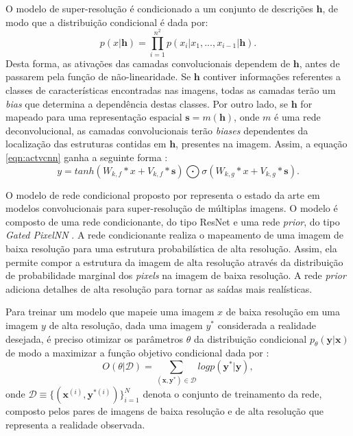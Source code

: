 O modelo de super-resolução é condicionado a um conjunto de
descrições $\boldsymbol{h}$, de modo que a distribuição condicional é dada
por:
\begin{equation}
\label{eqn:prodcnncond}
p(x|\boldsymbol{h}) = \prod_{i=1}^{n^2}p(x_i|x_1,...,x_{i-1}|\boldsymbol{h}).
\end{equation}
Desta forma, as ativações das camadas convolucionais dependem de $\boldsymbol{h}$,
antes de passarem pela função de não-linearidade. Se $\boldsymbol{h}$ contiver
informações referentes a classes de características encontradas nas imagens, todas as camadas terão um \textit{bias} que determina
a dependência destas classes. Por outro lado, se $\boldsymbol{h}$ for mapeado
para uma representação espacial $\boldsymbol{s}=m(\boldsymbol{h})$, onde $m$ é uma rede
deconvolucional, as camadas convolucionais terão \textit{biases} dependentes da localização
das estruturas contidas em $\boldsymbol{h}$, presentes na imagem. Assim, a equação \ref{eqn:actvcnn}
ganha a seguinte forma \citep{Oord16}:
\begin{equation}
\label{eqn:actvcnncond}
y = tanh(W_{k,f} * x + V_{k,f}*\boldsymbol{s})\bigodot \sigma(W_{k,g}*x + V_{k,g}*\boldsymbol{s}).
\end{equation}

O modelo de rede condicional proposto por \cite{DahlNS17} representa o estado da arte em modelos convolucionais para
super-resolução de múltiplas imagens. O modelo é composto de uma rede condicionante, do tipo ResNet \citep{He2016}
e uma rede \textit{prior}, do tipo \textit{Gated PixelNN} \citep{Oord16}.
A rede condicionante realiza o mapeamento de uma imagem de baixa resolução para uma estrutura probabilística
de alta resolução. Assim, ela permite compor a estrutura da imagem de alta resolução através da distribuição
de probabilidade marginal dos \textit{pixels} na imagem de baixa resolução. A rede \textit{prior} adiciona detalhes de alta resolução
para tornar as saídas mais realísticas. 

Para treinar um modelo que mapeie uma imagem $x$ de baixa resolução em uma imagem $y$ de alta resolução,
dada uma imagem $y^*$ considerada a realidade desejada, é preciso otimizar os parâmetros
$\theta$ da distribuição condicional $p_{\theta}(\boldsymbol{y}|\boldsymbol{x})$ de modo
a maximizar a função objetivo condicional dada por \citep{DahlNS17}:
\begin{equation}
\label{eqn:objfunc}
O(\theta|\mathcal{D})= \sum_{(\boldsymbol{x},\boldsymbol{y^*})\in \mathcal{D}} log p(\boldsymbol{y^*}|\boldsymbol{y}),
\end{equation}
onde $\mathcal{D} \equiv \{(\boldsymbol{x}^{(i)},\boldsymbol{y}^{*(i)})\}_{i=1}^N$ denota o conjunto
de treinamento da rede, composto pelos pares de imagens de baixa resolução e de alta resolução que representa
a realidade observada.

